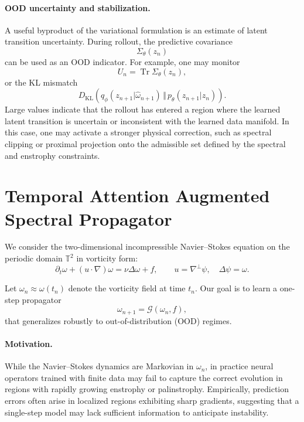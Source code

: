 \documentclass[11pt]{article}
\begin{document}
\paragraph{OOD uncertainty and stabilization.}
A useful byproduct of the variational formulation is an estimate of latent transition uncertainty. During rollout, the predictive covariance
\begin{equation}
    \Sigma_\theta(z_n)
\end{equation}
can be used as an OOD indicator. For example, one may monitor
\begin{equation}
    U_n = \operatorname{Tr}\Sigma_\theta(z_n),
\end{equation}
or the KL mismatch
\begin{equation}
    D_{\mathrm{KL}}
    \left(
        q_\phi(z_{n+1}|\widehat{\omega}_{n+1})
        \,\Vert\,
        p_\theta(z_{n+1}|z_n)
    \right).
\end{equation}
Large values indicate that the rollout has entered a region where the learned latent transition is uncertain or inconsistent with the learned data manifold. In this case, one may activate a stronger physical correction, such as spectral clipping or proximal projection onto the admissible set defined by the spectral and enstrophy constraints.

\section{Temporal Attention Augmented Spectral Propagator}

We consider the two-dimensional incompressible Navier--Stokes equation on the periodic domain $\mathbb{T}^2$ in vorticity form:
\begin{equation}
\partial_t \omega + (u \cdot \nabla)\omega = \nu \Delta \omega + f, 
\qquad u = \nabla^\perp \psi, \quad \Delta \psi = \omega.
\end{equation}

Let $\omega_n \approx \omega(t_n)$ denote the vorticity field at time $t_n$. Our goal is to learn a one-step propagator
\begin{equation}
\omega_{n+1} = \mathcal{G}(\omega_n, f),
\end{equation}
that generalizes robustly to out-of-distribution (OOD) regimes.

\paragraph{Motivation.}
While the Navier--Stokes dynamics are Markovian in $\omega_n$, in practice neural operators trained with finite data may fail to capture the correct evolution in regions with rapidly growing enstrophy or palinstrophy. Empirically, prediction errors often arise in localized regions exhibiting sharp gradients, suggesting that a single-step model may lack sufficient information to anticipate instability.
\end{document}
